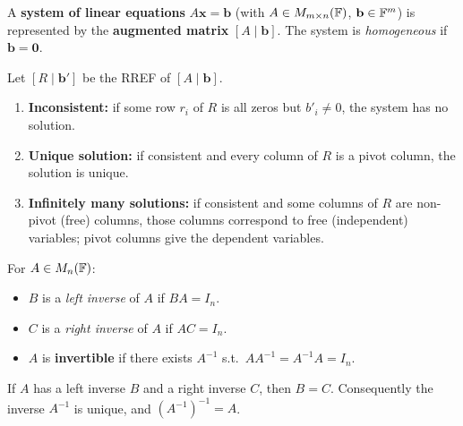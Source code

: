 \begin{defbox}
A \textbf{system of linear equations} $A\mathbf{x}=\mathbf{b}$ (with
$A\in M_{m\times n}(\mathbb{F})$, $\mathbf{b}\in\mathbb{F}^m$) is represented by the
\textbf{augmented matrix} $[A\mid\mathbf{b}]$.  The system is
\emph{homogeneous} if $\mathbf{b}=\mathbf{0}$.
\end{defbox}

\begin{methodbox}
Let $[R\mid\mathbf{b}']$ be the RREF of $[A\mid\mathbf{b}]$.
\begin{enumerate}
    \item \textbf{Inconsistent:} if some row $r_i$ of $R$ is all zeros but
          $b'_i\neq 0$, the system has no solution.
    \item \textbf{Unique solution:} if consistent and every column of $R$ is a
          pivot column, the solution is unique.
    \item \textbf{Infinitely many solutions:} if consistent and some columns of
          $R$ are non-pivot (free) columns, those columns correspond to free
          (independent) variables; pivot columns give the dependent variables.
\end{enumerate}
\end{methodbox}

\begin{defbox}
For $A\in M_{n}(\mathbb{F})$:
\begin{itemize}
    \item $B$ is a \emph{left inverse} of $A$ if $BA=I_n$.
    \item $C$ is a \emph{right inverse} of $A$ if $AC=I_n$.
    \item $A$ is \textbf{invertible} if there exists $A^{-1}$ s.t.\
          $AA^{-1}=A^{-1}A=I_n$.
\end{itemize}
\end{defbox}

\begin{thmbox}
If $A$ has a left inverse $B$ and a right inverse $C$, then $B=C$.
Consequently the inverse $A^{-1}$ is unique, and $(A^{-1})^{-1}=A$.
\end{thmbox}

